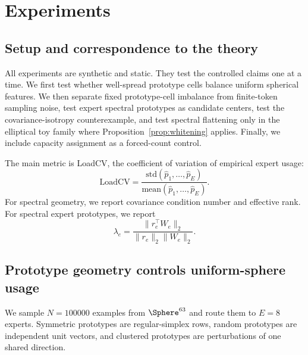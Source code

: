 \section{Experiments}

\subsection{Setup and correspondence to the theory}

All experiments are synthetic and static. They test the controlled claims one
at a time. We first test whether well-spread prototype cells balance uniform
spherical features. We then separate fixed prototype-cell imbalance from
finite-token sampling noise, test expert spectral prototypes as candidate
centers, test the covariance-isotropy counterexample, and test spectral
flattening only in the elliptical toy family where Proposition~\ref{prop:whitening}
applies. Finally, we include capacity assignment as a forced-count control.

The main metric is LoadCV, the coefficient of variation of empirical expert
usage:
\begin{equation}
 \mathrm{LoadCV}=\frac{\mathrm{std}(\widehat p_1,\ldots,\widehat p_E)}
 {\mathrm{mean}(\widehat p_1,\ldots,\widehat p_E)}.
\end{equation}
For spectral geometry, we report covariance condition number and effective
rank. For spectral expert prototypes, we report
\begin{equation}
 \lambda_e=\frac{\|r_e^\top W_e\|_2}{\|r_e\|_2\|W_e\|_2}.
\end{equation}

\subsection{Prototype geometry controls uniform-sphere usage}

We sample $N=100000$ examples from $\Sphere^{63}$ and route them to $E=8$
experts. Symmetric prototypes are regular-simplex rows, random prototypes are
independent unit vectors, and clustered prototypes are perturbations of one
shared direction.

\begin{table}[t]
\centering
\caption{Uniform-sphere routing with $d=64$ and $E=8$.}
\label{tab:uniform_sphere}
\small
{}
\end{table}

